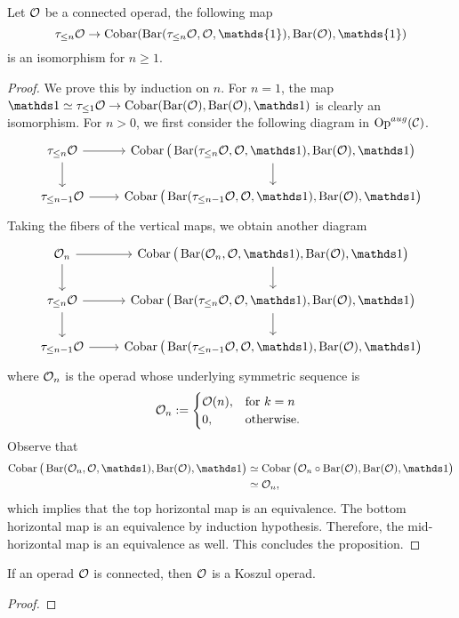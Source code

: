 \begin{proposition}
	Let ${\mathcal{O}}$ be a connected operad, the following map 
	$$
	\tau_{\leq n}\CO \rightarrow 
	\Cobar(\Barconstruction(\tau_{\leq n}\CO,\CO,\mathds{1}),\Barconstruction(\CO),\mathds{1})
	$$
	is an isomorphism for $n\geq 1$.
\end{proposition}
\begin{proof}
	We prove this by induction on $n$.
	For $n=1$, the map $\triv\simeq \tau_{\leq 1}\CO \rightarrow \Cobar(\Barconstruction(\CO),\Barconstruction(\CO),\triv)$ is clearly an isomorphism.
	For $n>0$, we first consider the following diagram in $\operatorname{Op}^{aug}({\mathcal{C}})$.
	\[
	\begin{tikzcd}
	\tau_{\leq n}\CO \ar[d]\ar[r] & \Cobar \big(\Barconstruction(\tau_{\leq n}\CO,\CO,\triv),\Barconstruction (\CO), \triv	 \big) \ar[d]  \\
	\tau_{\leq n-1}\CO \ar[r]    & 
	\Cobar \big(\Barconstruction(\tau_{\leq n-1}\CO,\CO,\triv),\Barconstruction (\CO), \triv	 \big)
	\end{tikzcd}
	\]
	Taking the fibers of the vertical maps, we obtain another diagram
		\[
	\begin{tikzcd}
	\CO_n \arrow[d] \arrow[r] & 
	\Cobar \big(\Barconstruction(\CO_n,\CO,\triv),\Barconstruction (\CO), \triv	 \big) \ar[d] \\
	\tau_{\leq n}\CO \ar[d]\ar[r] & \Cobar \big(\Barconstruction(\tau_{\leq n}\CO,\CO,\triv),\Barconstruction (\CO), \triv	 \big) \ar[d]  \\
	\tau_{\leq n-1}\CO \ar[r]    & 
	\Cobar \big(\Barconstruction(\tau_{\leq n-1}\CO,\CO,\triv),\Barconstruction (\CO), \triv	 \big)
	\end{tikzcd}
	\]
	where ${\mathcal{O}}_n$ is the operad whose underlying symmetric sequence is 
	$$
	 {\mathcal{O}}_n:= \begin{cases}
    {\mathcal{O}}(n), & \text{for } k = n \\
   0, & \text{otherwise. }         \\
  \end{cases}
	$$
	Observe that 
	\begin{align*}
			\Cobar \big(\Barconstruction(\CO_n,\CO,\triv),\Barconstruction (\CO), \triv \big) &
			\simeq \Cobar \big(\CO_n\circ \Barconstruction(\CO),\Barconstruction (\CO), \triv	 \big)\\
			& \simeq \CO_n,
	\end{align*}
	which implies that the top horizontal map is an equivalence. The bottom horizontal map is an equivalence by induction hypothesis. Therefore, the mid-horizontal map is an equivalence as well. This concludes the proposition.
	
\end{proof}
\begin{corollary}
		If an operad ${\mathcal{O}}$ is connected, then ${\mathcal{O}}$ is a Koszul operad.
\end{corollary}
\begin{proof}
	
\end{proof}

